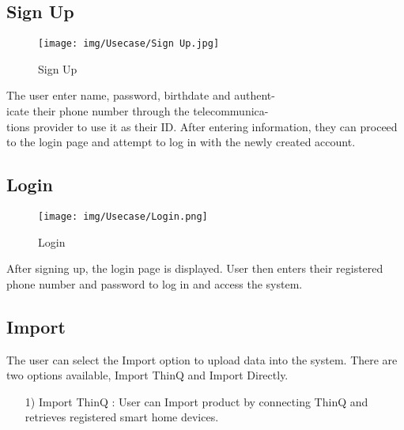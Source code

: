\documentclass[conference]{IEEEtran}
\begin{document}
\subsection{Sign Up}
\begin{figure}[h]
\hspace{1.5cm}
\centering
\begin{minipage}{0.4\columnwidth}
    \texttt{[image: img/Usecase/Sign Up.jpg]}
    \caption{Sign Up}
\end{minipage}
\end{figure}
The user enter name, password, birthdate and authent-\\icate their phone number through the telecommunica-\\tions provider to use it as their ID. After entering information, they can proceed to the login page and attempt to log in with the newly created account. \\

\subsection{Login}
\begin{figure}[h]
\hspace{1.5cm}
\centering
\begin{minipage}{0.4\columnwidth}
    \texttt{[image: img/Usecase/Login.png]}
    \caption{Login}
\end{minipage}
\end{figure}
After signing up, the login page is displayed. User then enters their registered phone number and password to log in and access the system. \\

\subsection{Import}
The user can select the Import option to upload data into the system. There are two options available, Import ThinQ
and Import Directly. \\

\begin{enumerate}
\begin{figure}[h]
\hspace{1.5cm}
\centering
\begin{minipage}{0.4\columnwidth}
    \texttt{[image: img/Usecase/Import.png]}
    \caption{Import ThinQ}
\end{minipage}
\end{figure}
    \item [1)] Import ThinQ : User can Import product by connecting ThinQ and retrieves registered smart home devices. \\
\end{enumerate}
\end{document}
